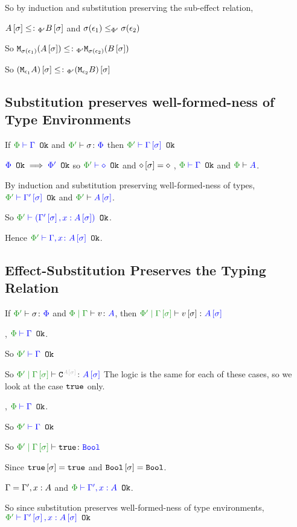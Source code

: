 {So by induction and substitution preserving the sub-effect relation, 

$A\left[\sigma\right]\leq\colon_{\Phi'} B\left[\sigma\right]$ and $\sigma(\epsilon_1)\leq_{\Phi'}\sigma(\epsilon_2)$

So $\texttt{M}_{\sigma(\epsilon_1)}{(A\left[\sigma\right])} \leq\colon_{\Phi'}\texttt{M}_{\sigma(\epsilon_2)}{(B\left[\sigma\right])}$

So $(\texttt{M}_{\epsilon_1}{A})\left[\sigma\right] \leq\colon_{\Phi'}(\texttt{M}_{\epsilon_2}{B})\left[\sigma\right]$


\subsection{Substitution preserves well-formed-ness of Type Environments}

If $\wellformedok{\P}{\G}$ and $\typerelation{\P'}{\si}{\P}$ then $\wellformedok{\P'}{\G\ssi}$

\proof
{}
${\color{blue} \Phi} \texttt{ Ok}\implies{\color{blue} \Phi'} \texttt{ Ok}$ so $\wellformedok{\P'}{\nil}$
and $\diamond\left[\sigma\right] = \diamond$
\bi, $\wellformedok{\P}{\G}$ and $\wellformed{\P}{A}$.

By induction and substitution preserving well-formed-ness of types, $\wellformedok{\P'}{\G'\ssi}$ and $\wellformed{\P'}{A\ssi}$.


So $\wellformedok{\P'}{(\G'\ssi, x: A\ssi)}$.

Hence $\wellformedok{\P'}{\gax\ssi}$.

\subsection{Effect-Substitution Preserves the Typing Relation}

If $\typerelation{\P'}{\si}{\P}$ and $\gpetyperelation{v}{A}$, then $\etyperelation{\P'}{\G\ssi}{v\ssi}{A\ssi}$


\proof
{}
\bi, $\wellformedok{\P}{\G}$.

So $\wellformedok{\P'}{\G}$

So $\etyperelation{\P'}{\G\ssi}{\const{A\ssi}}{A\ssi}$
The logic is the same for each of these cases, so we look at the case $\texttt{true}$ only.

\bi, $\wellformedok{\P}{\G}$.

So $\wellformedok{\P'}{\G}$

So $\etyperelation{\P'}{\G\ssi}{\t}{\B}$

Since $\texttt{true}\left[\sigma\right]=\texttt{true}$ and $\texttt{Bool}\left[\sigma\right]=\texttt{Bool}$.

\bi $\Gamma = \Gamma', x:A$ and $\wellformedok{\P}{\G', x:A}$.

So since substitution preserves well-formed-ness of type environments, $\wellformedok{\P'}{\G'\ssi, x:A\ssi}$

}
